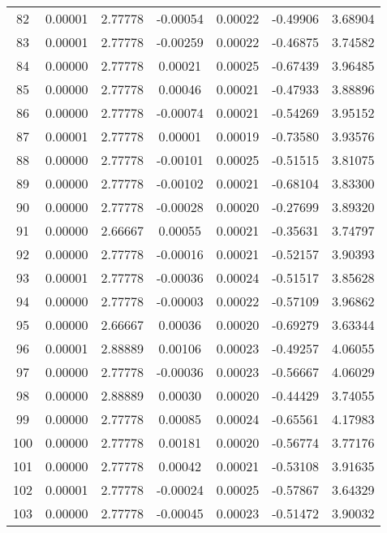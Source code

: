 \begin{longtable}{c c c c c c c}
82  &  0.00001 &      2.77778 & -0.00054 &   0.00022 &  -0.49906 &   3.68904 \\
83  &  0.00001 &      2.77778 & -0.00259 &   0.00022 &  -0.46875 &   3.74582 \\
84  &  0.00000 &      2.77778 &  0.00021 &   0.00025 &  -0.67439 &   3.96485 \\
85  &  0.00000 &      2.77778 &  0.00046 &   0.00021 &  -0.47933 &   3.88896 \\
86  &  0.00000 &      2.77778 & -0.00074 &   0.00021 &  -0.54269 &   3.95152 \\
87  &  0.00001 &      2.77778 &  0.00001 &   0.00019 &  -0.73580 &   3.93576 \\
88  &  0.00000 &      2.77778 & -0.00101 &   0.00025 &  -0.51515 &   3.81075 \\
89  &  0.00000 &      2.77778 & -0.00102 &   0.00021 &  -0.68104 &   3.83300 \\
90  &  0.00000 &      2.77778 & -0.00028 &   0.00020 &  -0.27699 &   3.89320 \\
91  &  0.00000 &      2.66667 &  0.00055 &   0.00021 &  -0.35631 &   3.74797 \\
92  &  0.00000 &      2.77778 & -0.00016 &   0.00021 &  -0.52157 &   3.90393 \\
93  &  0.00001 &      2.77778 & -0.00036 &   0.00024 &  -0.51517 &   3.85628 \\
94  &  0.00000 &      2.77778 & -0.00003 &   0.00022 &  -0.57109 &   3.96862 \\
95  &  0.00000 &      2.66667 &  0.00036 &   0.00020 &  -0.69279 &   3.63344 \\
96  &  0.00001 &      2.88889 &  0.00106 &   0.00023 &  -0.49257 &   4.06055 \\
97  &  0.00000 &      2.77778 & -0.00036 &   0.00023 &  -0.56667 &   4.06029 \\
98  &  0.00000 &      2.88889 &  0.00030 &   0.00020 &  -0.44429 &   3.74055 \\
99  &  0.00000 &      2.77778 &  0.00085 &   0.00024 &  -0.65561 &   4.17983 \\
100 &  0.00000 &      2.77778 &  0.00181 &   0.00020 &  -0.56774 &   3.77176 \\
101 &  0.00000 &      2.77778 &  0.00042 &   0.00021 &  -0.53108 &   3.91635 \\
102 &  0.00001 &      2.77778 & -0.00024 &   0.00025 &  -0.57867 &   3.64329 \\
103 &  0.00000 &      2.77778 & -0.00045 &   0.00023 &  -0.51472 &   3.90032 \\

\end{longtable}

